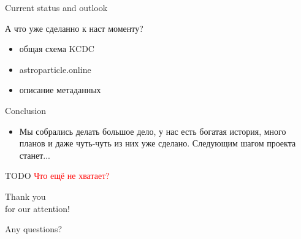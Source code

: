 \documentclass[18pt]{beamer}
\begin{document}
\begin{frame}{Current status and outlook}
\begin{block}{А что уже сделанно к наст моменту?}
  \begin{itemize}
    \item общая схема KCDC
    \item astroparticle.online
    \item описание метаданных
  \end{itemize}
\end{block}
\begin{block}{Conclusion}
  \begin{itemize}
    \item Мы собрались делать большое дело, у нас есть богатая история, много планов и даже чуть-чуть из них уже сделано. Следующим шагом проекта станет...
  \end{itemize}
\end{block}
\end{frame}

\begin{frame}{TODO}
\textcolor{red}{Что ещё не хватает?}
\end{frame}

\begin{frame}{}
\Huge
\begin{center}
\textcolor{kit-green100}{Thank you\\for our attention!}

\vspace{1em}
\textcolor{kit-green100}{Any questions?}
\end{center}
\end{frame}

%
%
\end{document}
